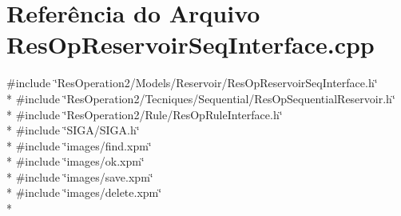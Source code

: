 \section{Referência do Arquivo Res\+Op\+Reservoir\+Seq\+Interface.\+cpp}
\label{_res_op_reservoir_seq_interface_8cpp}
{\ttfamily \#include \char`\"{}Res\+Operation2/\+Models/\+Reservoir/\+Res\+Op\+Reservoir\+Seq\+Interface.\+h\char`\"{}}\\*
{\ttfamily \#include \char`\"{}Res\+Operation2/\+Tecniques/\+Sequential/\+Res\+Op\+Sequential\+Reservoir.\+h\char`\"{}}\\*
{\ttfamily \#include \char`\"{}Res\+Operation2/\+Rule/\+Res\+Op\+Rule\+Interface.\+h\char`\"{}}\\*
{\ttfamily \#include \char`\"{}S\+I\+G\+A/\+S\+I\+G\+A.\+h\char`\"{}}\\*
{\ttfamily \#include \char`\"{}images/find.\+xpm\char`\"{}}\\*
{\ttfamily \#include \char`\"{}images/ok.\+xpm\char`\"{}}\\*
{\ttfamily \#include \char`\"{}images/save.\+xpm\char`\"{}}\\*
{\ttfamily \#include \char`\"{}images/delete.\+xpm\char`\"{}}\\*
